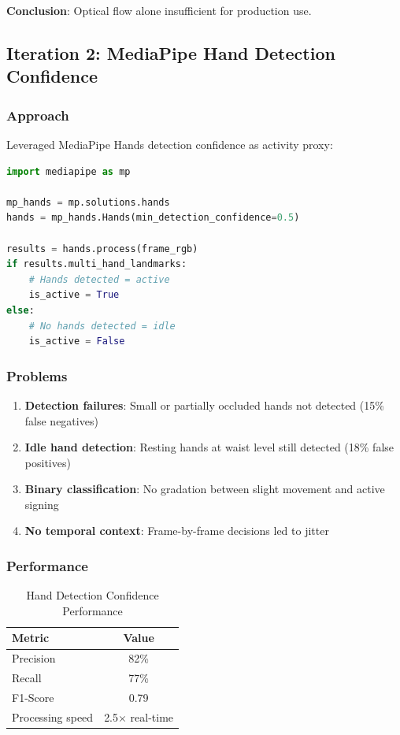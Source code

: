 \documentclass[11pt,a4paper]{article}
\begin{document}
\textbf{Conclusion}: Optical flow alone insufficient for production use.

\subsection{Iteration 2: MediaPipe Hand Detection Confidence}

\subsubsection{Approach}

Leveraged MediaPipe Hands detection confidence as activity proxy:

\begin{lstlisting}[language=Python]
import mediapipe as mp

mp_hands = mp.solutions.hands
hands = mp_hands.Hands(min_detection_confidence=0.5)

results = hands.process(frame_rgb)
if results.multi_hand_landmarks:
    # Hands detected = active
    is_active = True
else:
    # No hands detected = idle
    is_active = False
\end{lstlisting}

\subsubsection{Problems}

\begin{enumerate}
    \item \textbf{Detection failures}: Small or partially occluded hands not detected (15\% false negatives)
    \item \textbf{Idle hand detection}: Resting hands at waist level still detected (18\% false positives)
    \item \textbf{Binary classification}: No gradation between slight movement and active signing
    \item \textbf{No temporal context}: Frame-by-frame decisions led to jitter
\end{enumerate}

\subsubsection{Performance}

\begin{table}[htbp]
\centering
\caption{Hand Detection Confidence Performance}
\begin{tabular}{@{}lc@{}}
\toprule
\textbf{Metric} & \textbf{Value} \\ \midrule
Precision & 82\% \\
Recall & 77\% \\
F1-Score & 0.79 \\
Processing speed & 2.5$\times$ real-time \\
\bottomrule
\end{tabular}
\end{table}
\end{document}
